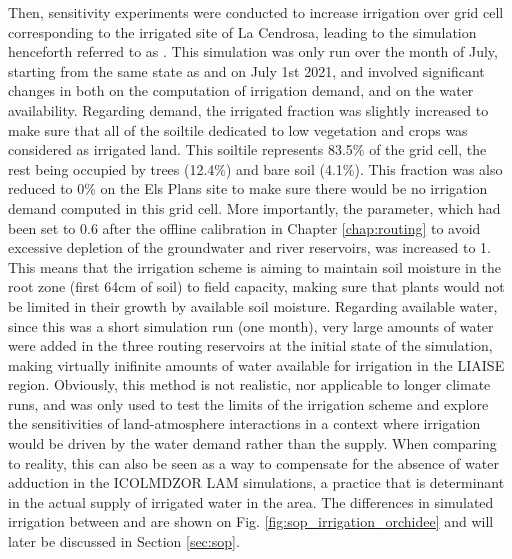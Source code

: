 Then, sensitivity experiments were conducted to increase irrigation over grid cell corresponding to the irrigated site of La Cendrosa, leading to the simulation henceforth referred to as \irrboost. This simulation was only run over the month of July, starting from the same state as \noirr and \irr on July 1st 2021, and involved significant changes in both on the computation of irrigation demand, and on the water availability. 
Regarding demand, the irrigated fraction was slightly increased to make sure that all of the soiltile dedicated to low vegetation and crops was considered as irrigated land. This soiltile represents 83.5\% of the grid cell, the rest being occupied by trees (12.4\%) and bare soil (4.1\%). This fraction was also reduced to 0\% on the Els Plans site to make sure there would be no irrigation demand computed in this grid cell.
More importantly, the \betairrig parameter, which had been set to 0.6 after the offline calibration in Chapter \ref{chap:routing} to avoid excessive depletion of the groundwater and river reservoirs, was increased to 1. This means that the irrigation scheme is aiming to maintain soil moisture in the root zone (first 64cm of soil) to field capacity, making sure that plants would not be limited in their growth by available soil moisture. 
Regarding available water, since this was a short simulation run (one month), very large amounts of water were added in the three routing reservoirs at the initial state of the simulation, making virtually inifinite amounts of water available for irrigation in the LIAISE region. Obviously, this method is not realistic, nor applicable to longer climate runs, and was only used to test the limits of the irrigation scheme and explore the sensitivities of land-atmosphere interactions in a context where irrigation would be driven by the water demand rather than the supply. 
When comparing to reality, this can also be seen as a way to compensate for the absence of water adduction in the ICOLMDZOR LAM simulations, a practice that is determinant in the actual supply of irrigated water in the area. 
The differences in simulated irrigation between \irr and \noirr are shown on Fig. \ref{fig:sop_irrigation_orchidee} and will later be discussed in Section \ref{sec:sop}.

